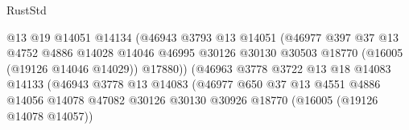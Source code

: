 \begin{lexlean}{RustStd}
\begin{coremodule}
                                            @13
                                            @19
                                            @14051
                                            @14134
                                            (@46943
                                              @3793
                                              @13
                                              @14051
                                              (@46977
                                                @397
                                                @37
                                                @13
                                                @4752
                                                @4886
                                                @14028
                                                @14046
                                                @46995
                                                @30126
                                                @30130
                                                @30503
                                                @18770
                                                (@16005 (@19126 @14046 @14029))
                                                @17880))
                                            (@46963
                                              @3778
                                              @3722
                                              @13
                                              @18
                                              @14083
                                              @14133
                                              (@46943
                                                @3778
                                                @13
                                                @14083
                                                (@46977
                                                  @650
                                                  @37
                                                  @13
                                                  @4551
                                                  @4886
                                                  @14056
                                                  @14078
                                                  @47082
                                                  @30126
                                                  @30130
                                                  @30926
                                                  @18770
                                                  (@16005 (@19126 @14078 @14057))

\end{coremodule}
\end{lexlean}

